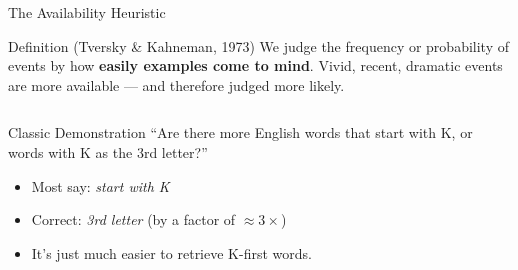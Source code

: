 \documentclass[aspectratio=169]{beamer}
\begin{document}
\begin{frame}{The Availability Heuristic}
\begin{block}{Definition (Tversky \& Kahneman, 1973)}
We judge the frequency or probability of events by how \textbf{easily examples come to mind}. Vivid, recent, dramatic events are more available --- and therefore judged more likely.
\end{block}
\begin{columns}
\begin{block}{Classic Demonstration}
``Are there more English words that start with K, or words with K as the 3rd letter?''
\begin{itemize}
  \item Most say: \textit{start with K}
  \item Correct: \textit{3rd letter} (by a factor of $\approx 3\times$)
  \item It's just much easier to retrieve K-first words.
\end{itemize}
\end{block}
\end{columns}
\end{frame}
\end{document}
